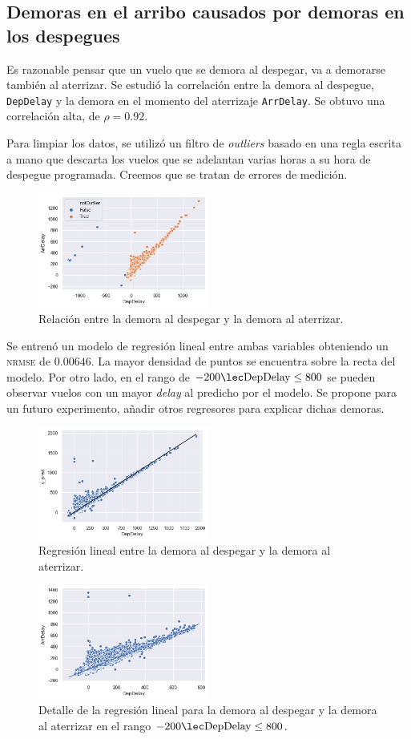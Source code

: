 \subsection{Demoras en el arribo causados por demoras en los despegues}%
\label{sub:dep_arr_delay}

Es razonable pensar que un vuelo que se demora al despegar, va a demorarse
también al aterrizar. Se estudió la correlación entre la demora al despegue,
\texttt{DepDelay} y la demora en el momento del aterrizaje \texttt{ArrDelay}.
Se obtuvo una correlación alta, de $\rho=0.92$.

Para limpiar los datos, se utilizó un filtro de \textit{outliers} basado en una
regla escrita a mano que descarta los vuelos que se adelantan varias horas a su
hora de despegue programada. Creemos que se tratan de errores de medición.

\begin{figure}[H]
\centering
\includegraphics[width=0.5\textwidth]{img/dep_arr_delay_outliers_a_mano.png}
\caption{Relación entre la demora al despegar y la demora al aterrizar.}
\end{figure}

Se entrenó un modelo de regresión lineal entre ambas variables obteniendo un
\textsc{nrmse} de $0.00646$. La mayor densidad de puntos se encuentra sobre la
recta del modelo. Por otro lado, en el rango de
$-200\lec\mathrm{DepDelay}\leq800$ se pueden observar vuelos con un mayor
\textit{delay} al predicho por el modelo. Se propone para un futuro
experimento, añadir otros regresores para explicar dichas demoras.

\begin{figure}[H]
\centering
\includegraphics[width=0.5\textwidth]{img/dep_arr_delay_regplot.png}
\caption{Regresión lineal entre la demora al despegar y la demora al aterrizar.}
\end{figure}

\begin{figure}[H]
\centering
\includegraphics[width=0.5\textwidth]{img/dep_arr_delay_detalle.png}
\caption{
    Detalle de la regresión lineal para la demora al despegar y la demora al
    aterrizar en el rango $-200\lec\mathrm{DepDelay}\leq800$.
}
\end{figure}
